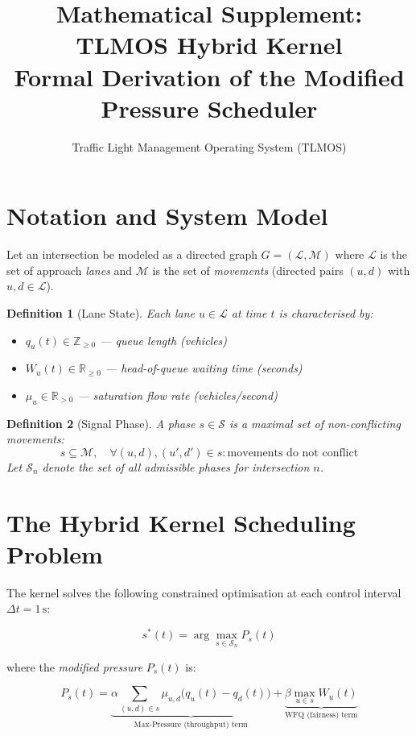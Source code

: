 \documentclass[11pt]{article}
\title{Mathematical Supplement: TLMOS Hybrid Kernel\\
\large Formal Derivation of the Modified Pressure Scheduler}
\author{Traffic Light Management Operating System (TLMOS)}
\date{}
\newtheorem{definition}{Definition}
\begin{document}
\maketitle

\section{Notation and System Model}

Let an intersection be modeled as a directed graph $G = (\mathcal{L}, \mathcal{M})$
where $\mathcal{L}$ is the set of approach \emph{lanes} and $\mathcal{M}$ is the set
of \emph{movements} (directed pairs $(u, d)$ with $u, d \in \mathcal{L}$).

\begin{definition}[Lane State]
Each lane $u \in \mathcal{L}$ at time $t$ is characterised by:
\begin{itemize}
  \item $q_u(t) \in \mathbb{Z}_{\geq 0}$ — queue length (vehicles)
  \item $W_u(t) \in \mathbb{R}_{\geq 0}$ — head-of-queue waiting time (seconds)
  \item $\mu_u \in \mathbb{R}_{>0}$ — saturation flow rate (vehicles/second)
\end{itemize}
\end{definition}

\begin{definition}[Signal Phase]
A phase $s \in \mathcal{S}$ is a maximal set of non-conflicting movements:
\[
  s \subseteq \mathcal{M}, \quad \forall (u,d),(u',d') \in s: \text{movements do not conflict}
\]
Let $\mathcal{S}_n$ denote the set of all admissible phases for intersection $n$.
\end{definition}

\section{The Hybrid Kernel Scheduling Problem}

The kernel solves the following constrained optimisation at each control interval
$\Delta t = 1\,\text{s}$:

\begin{equation}
  \boxed{s^*(t) = \arg\max_{s \in \mathcal{S}_n} P_s(t)}
  \label{eq:argmax}
\end{equation}

where the \emph{modified pressure} $P_s(t)$ is:

\begin{equation}
  P_s(t) = \underbrace{\alpha \sum_{(u,d) \in s} \mu_{u,d}
  \bigl(q_u(t) - q_d(t)\bigr)}_{\text{Max-Pressure (throughput) term}}
  + \underbrace{\beta \max_{u \in s} W_u(t)}_{\text{WFQ (fairness) term}}
  \label{eq:pressure}
\end{equation}
\end{document}
